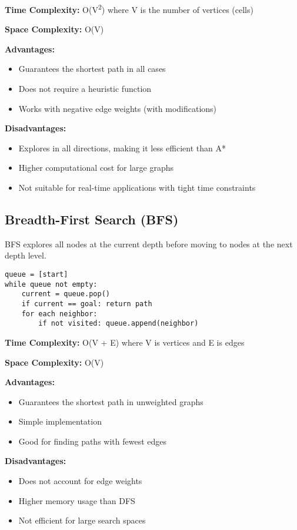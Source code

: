 \documentclass[11pt,a4paper]{report}
\begin{document}
\textbf{Time Complexity:} O(V\textsuperscript{2}) where V is the number of vertices (cells)

\textbf{Space Complexity:} O(V)

\textbf{Advantages:}
\begin{itemize}
    \item Guarantees the shortest path in all cases
    \item Does not require a heuristic function
    \item Works with negative edge weights (with modifications)
\end{itemize}

\textbf{Disadvantages:}
\begin{itemize}
    \item Explores in all directions, making it less efficient than A*
    \item Higher computational cost for large graphs
    \item Not suitable for real-time applications with tight time constraints
\end{itemize}

\subsection{Breadth-First Search (BFS)}
BFS explores all nodes at the current depth before moving to nodes at the next depth level.

\begin{verbatim}
queue = [start]
while queue not empty:
    current = queue.pop()
    if current == goal: return path
    for each neighbor:
        if not visited: queue.append(neighbor)
\end{verbatim}

\textbf{Time Complexity:} O(V + E) where V is vertices and E is edges

\textbf{Space Complexity:} O(V)

\textbf{Advantages:}
\begin{itemize}
    \item Guarantees the shortest path in unweighted graphs
    \item Simple implementation
    \item Good for finding paths with fewest edges
\end{itemize}

\textbf{Disadvantages:}
\begin{itemize}
    \item Does not account for edge weights
    \item Higher memory usage than DFS
    \item Not efficient for large search spaces
\end{itemize}
\end{document}
